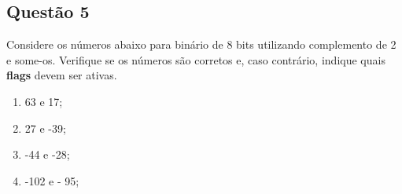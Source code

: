 \documentclass{article}
\begin{document}
        \subsection{Questão 5}
            \begin{exercise}
                Considere os números abaixo para binário de 8 bits utilizando complemento de 2 e some-os. Verifique se os números são corretos e, caso contrário, indique quais \textbf{flags} devem ser ativas.
                \begin{enumerate}[noitemsep]
                    \item 63 e 17;
                    \item 27 e -39;
                    \item -44 e -28;
                    \item -102 e - 95;
                \end{enumerate}
            \end{exercise}
\end{document}
